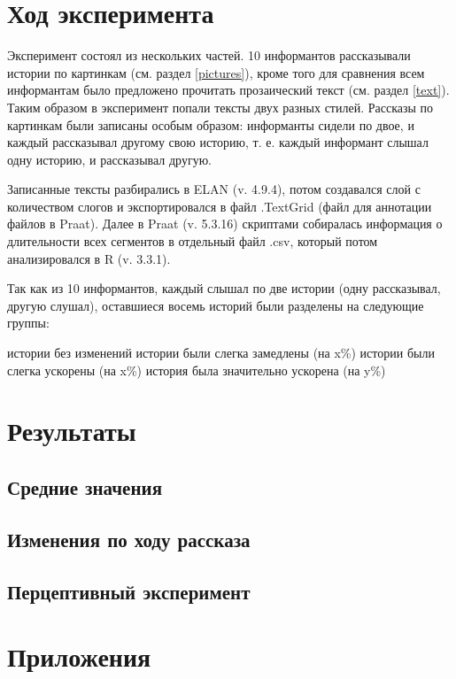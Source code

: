\section{Ход эксперимента}
Эксперимент состоял из нескольких частей. 10 информантов рассказывали истории по картинкам (см. раздел \ref{pictures}), кроме того для сравнения всем информантам было предложено прочитать прозаический текст (см. раздел \ref{text}). Таким образом в эксперимент попали тексты двух разных стилей. Рассказы по картинкам были записаны особым образом: информанты сидели по двое, и каждый рассказывал другому свою историю, т. е. каждый информант слышал одну историю, и рассказывал другую.
\par Записанные тексты разбирались в ELAN (v. 4.9.4), потом создавался слой с количеством слогов и экспортировался в файл .TextGrid (файл для аннотации файлов в Praat). Далее в Praat (v. 5.3.16) скриптами собиралась информация о длительности всех сегментов в отдельный файл .csv, который потом анализировался в R (v. 3.3.1).
\par Так как из 10 информантов, каждый слышал по две истории (одну рассказывал, другую слушал), оставшиеся восемь историй были разделены на следующие группы:
\begin{itemize}
 истории без изменений
 истории были слегка замедлены (на x\%)
 истории были слегка ускорены (на x\%)
 история была значительно ускорена (на y\%)
\end{itemize}
\section{Результаты}
\subsection{Средние значения}
\subsection{Изменения по ходу рассказа}
\subsection{Перцептивный эксперимент}
\pagebreak
\footnotesize


\normalsize
\section{Приложения}
